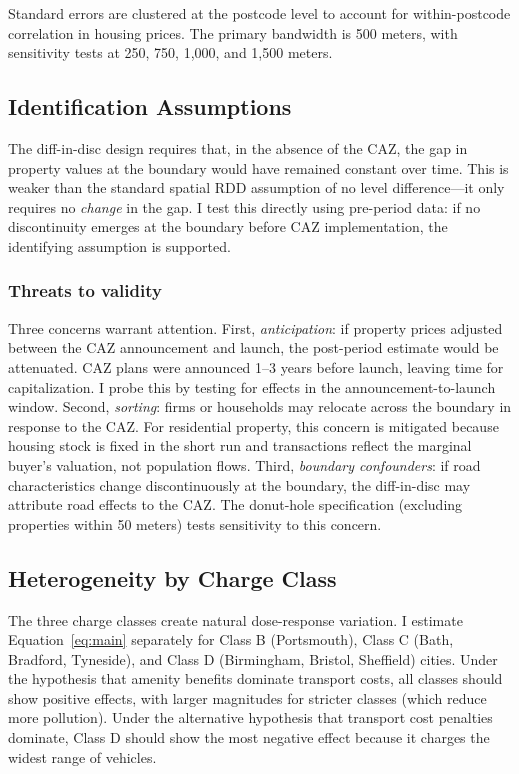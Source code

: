 \documentclass[12pt]{article}
\begin{document}
Standard errors are clustered at the postcode level to account for within-postcode correlation in housing prices. The primary bandwidth is 500 meters, with sensitivity tests at 250, 750, 1,000, and 1,500 meters.

\subsection{Identification Assumptions}

The diff-in-disc design requires that, in the absence of the CAZ, the gap in property values at the boundary would have remained constant over time. This is weaker than the standard spatial RDD assumption of no level difference---it only requires no \textit{change} in the gap. I test this directly using pre-period data: if no discontinuity emerges at the boundary before CAZ implementation, the identifying assumption is supported.

\subsubsection*{Threats to validity} Three concerns warrant attention. First, \textit{anticipation}: if property prices adjusted between the CAZ announcement and launch, the post-period estimate would be attenuated. CAZ plans were announced 1--3 years before launch, leaving time for capitalization. I probe this by testing for effects in the announcement-to-launch window. Second, \textit{sorting}: firms or households may relocate across the boundary in response to the CAZ. For residential property, this concern is mitigated because housing stock is fixed in the short run and transactions reflect the marginal buyer's valuation, not population flows. Third, \textit{boundary confounders}: if road characteristics change discontinuously at the boundary, the diff-in-disc may attribute road effects to the CAZ. The donut-hole specification (excluding properties within 50 meters) tests sensitivity to this concern.

\subsection{Heterogeneity by Charge Class}

The three charge classes create natural dose-response variation. I estimate Equation~\eqref{eq:main} separately for Class B (Portsmouth), Class C (Bath, Bradford, Tyneside), and Class D (Birmingham, Bristol, Sheffield) cities. Under the hypothesis that amenity benefits dominate transport costs, all classes should show positive effects, with larger magnitudes for stricter classes (which reduce more pollution). Under the alternative hypothesis that transport cost penalties dominate, Class D should show the most negative effect because it charges the widest range of vehicles.
\end{document}
